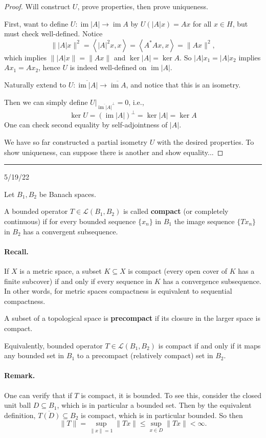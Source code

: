 \documentclass[12pt]{article}
\newcommand{\keyword}[1]{\textbf{#1}}
\newcommand{\sepline}{\rule{\textwidth}{0.4pt}}
\theoremstyle{definition}
\newcommand{\LL}{\mathcal{L}}
\newcommand{\<}{\left\langle}
\renewcommand{\>}{\right\rangle}
\newcommand{\seq}{\subseteq}
\DeclareMathOperator{\im}{im}
\newcommand{\clo}{\overline}
\begin{document}
\begin{proof}
    Will construct $U$, prove properties, then prove uniqueness.

    First, want to define $U : \im|A| \to \im A$ by $U(|A|x) = Ax$ for all $x \in H$, but must check well-defined.
    Notice
    \[
        \||A|x\|^2 = \<|A|^2x, x\> = \<A^*Ax, x\> = \|Ax\|^2,
    \]
    which implies $\||A|x\| = \|Ax\|$ and $\ker|A| = \ker A$.
    So $|A|x_1 = |A|x_2$ implies $Ax_1 = Ax_2$, hence $U$ is indeed well-defined on $\im|A|$.

    Naturally extend to $U : \clo{\im|A|} \to \clo{\im A}$, and notice that this is an isometry.

    Then we can simply define $U|_{\clo{\im|A|}^\perp} = 0$, i.e.,
    \[
        \ker U = (\im|A|)^\perp = \ker|A| = \ker A
    \]
    One can check second equality by self-adjointness of $|A|$.

    We have so far constructed a partial isometry $U$ with the desired properties.
    To show uniqueness, can suppose there is another and show equality...
\end{proof}

\sepline

5/19/22

Let $B_1, B_2$ be Banach spaces.

A bounded operator $T \in \LL(B_1, B_2)$ is called \keyword{compact} (or completely continuous) if for every bounded sequence $\{x_n\}$ in $B_1$ the image sequence $\{Tx_n\}$ in $B_2$ has a convergent subsequence.

\paragraph{Recall.}
If $X$ is a metric space, a subset $K \seq X$ is compact (every open cover of $K$ has a finite subcover) if and only if every sequence in $K$ has a convergence subsequence.
In other words, for metric spaces compactness is equivalent to sequential compactness.

A subset of a topological space is \keyword{precompact} if its closure in the larger space is compact.

Equivalently, bounded operator $T \in \LL(B_1, B_2)$ is compact if and only if it maps any bounded set in $B_1$ to a precompact (relatively compact) set in $B_2$.

\paragraph{Remark.}
One can verify that if $T$ is compact, it is bounded.
To see this, consider the closed unit ball $D \seq B_1$, which is in particular a bounded set.
Then by the equivalent definition, $\clo{T(D)} \seq B_2$ is compact, which is in particular bounded.
So then
\[
    \|T\| = \sup_{\|x\|=1} \|Tx\| \leq \sup_{x \in D} \|Tx\| < \infty.
\]
\end{document}
